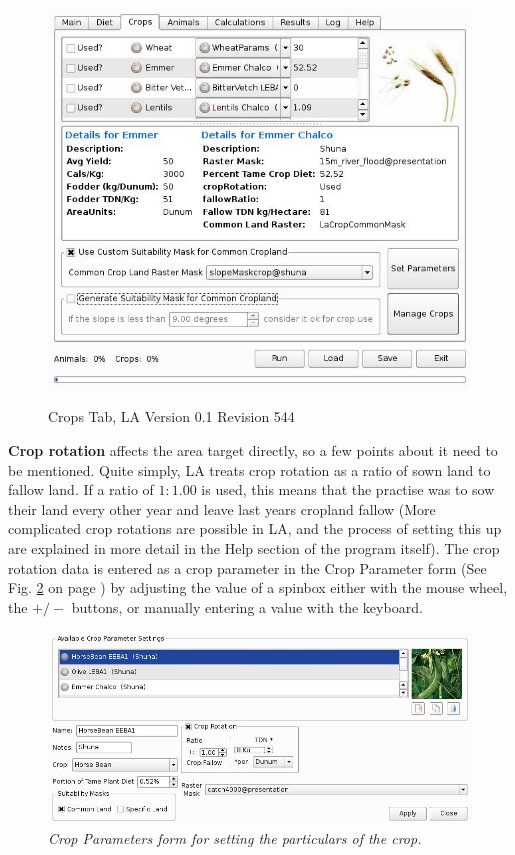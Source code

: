     \begin{figure}[htbp]
        \includegraphics[scale=.366]{./images/LanduseAnalystCrops546.jpg}
      \label{fig:crop} \caption{Crops Tab, LA Version 0.1 Revision 544}
    \end{figure}
    
  \textbf{Crop rotation} affects the area target directly, so a few points about it need to be
mentioned.  Quite simply, LA  treats crop rotation as a ratio of sown land to fallow land.  If a ratio of $1:1.00$ is used,
this means that the practise was to sow their land every other year and leave last years cropland fallow (More complicated crop rotations
are possible in LA, and the process of setting this up are explained in more detail in the Help section of the program itself).  The crop
rotation data is entered as a crop parameter in the Crop Parameter form (See Fig. \ref{fig:cropParameters} on page
\pageref{fig:cropParameters})  by adjusting the value of a spinbox either with the mouse wheel, the $+/-$ buttons, or manually entering a
value with the keyboard.
    \begin{figure}[htbp] %
        \includegraphics[scale=.28]{./images/cropParameters.jpg}
      \caption[Crop Parameters]{\label{fig:cropParameters}\textit{Crop Parameters form for setting the particulars of the crop.}}
    \end{figure}


